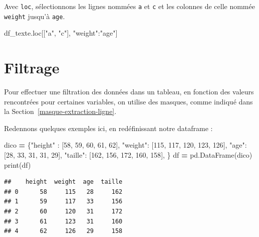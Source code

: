 \documentclass[12pt,]{book}
\newenvironment{Shaded}{\begin{snugshade}}{\end{snugshade}}
\newcommand{\DecValTok}[1]{\textcolor[rgb]{0.00,0.00,0.81}{#1}}
\newcommand{\StringTok}[1]{\textcolor[rgb]{0.31,0.60,0.02}{#1}}
\newcommand{\OperatorTok}[1]{\textcolor[rgb]{0.81,0.36,0.00}{\textbf{#1}}}
\newcommand{\BuiltInTok}[1]{#1}
\newcommand{\NormalTok}[1]{#1}
\numberwithin{equation}{section}
\numberwithin{countremarque}{section}
\begin{document}
Avec \texttt{loc}, sélectionnons les lignes nommées \texttt{a} et
\texttt{c} et les colonnes de celle nommée \texttt{weight} jusqu'à
\texttt{age}.

\begin{Shaded}
\begin{Highlighting}[]
\NormalTok{df_texte.loc[[}\StringTok{"a"}\NormalTok{, }\StringTok{"c"}\NormalTok{], }\StringTok{"weight"}\NormalTok{:}\StringTok{"age"}\NormalTok{]}
\end{Highlighting}
\end{Shaded}

\section{Filtrage}\label{filtrage}

Pour effectuer une filtration des données dans un tableau, en fonction
des valeurs rencontrées pour certaines variables, on utilise des
masques, comme indiqué dans la Section~\ref{masque-extraction-ligne}.

Redennons quelques exemples ici, en redéfinissant notre dataframe :

\begin{Shaded}
\begin{Highlighting}[]
\NormalTok{dico }\OperatorTok{=}\NormalTok{ \{}\StringTok{"height"}\NormalTok{ : [}\DecValTok{58}\NormalTok{, }\DecValTok{59}\NormalTok{, }\DecValTok{60}\NormalTok{, }\DecValTok{61}\NormalTok{, }\DecValTok{62}\NormalTok{],}
        \StringTok{"weight"}\NormalTok{: [}\DecValTok{115}\NormalTok{, }\DecValTok{117}\NormalTok{, }\DecValTok{120}\NormalTok{, }\DecValTok{123}\NormalTok{, }\DecValTok{126}\NormalTok{],}
        \StringTok{"age"}\NormalTok{: [}\DecValTok{28}\NormalTok{, }\DecValTok{33}\NormalTok{, }\DecValTok{31}\NormalTok{, }\DecValTok{31}\NormalTok{, }\DecValTok{29}\NormalTok{],}
        \StringTok{"taille"}\NormalTok{: [}\DecValTok{162}\NormalTok{, }\DecValTok{156}\NormalTok{, }\DecValTok{172}\NormalTok{, }\DecValTok{160}\NormalTok{, }\DecValTok{158}\NormalTok{],}
\NormalTok{       \} }
\NormalTok{df }\OperatorTok{=}\NormalTok{ pd.DataFrame(dico)}
\BuiltInTok{print}\NormalTok{(df)}
\end{Highlighting}
\end{Shaded}

\begin{lstlisting}
##    height  weight  age  taille
## 0      58     115   28     162
## 1      59     117   33     156
## 2      60     120   31     172
## 3      61     123   31     160
## 4      62     126   29     158
\end{lstlisting}
\end{document}
